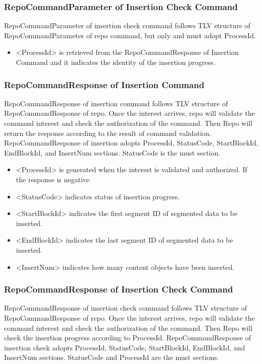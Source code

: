 \documentclass{acm_proc_article-sp}
\begin{document}
\subsubsection{RepoCommandParameter of Insertion Check Command}
RepoCommandParameter of insertion check command follows TLV structure of RepoCommandParameter of repo command, but only and must adopt ProcessId.

\begin{itemize}
\item <ProcessId> is retrieved from the RepoCommandResponse of Insertion Command and it indicates the identity of the insertion progress.
\end{itemize}

\subsubsection{RepoCommandResponse of Insertion Command}
RepoCommandResponse of insertion command follows TLV structure of RepoCommandResponse of repo. Once the interest arrives, repo will validate the command interest and check the authorization of the command. Then Repo will return the response according to the result of command validation. RepoCommandResponse of insertion adopts ProcessId, StatusCode, StartBlockId, EndBlockId, and InsertNum sections. StatusCode is the must section.

\begin{itemize}
\item <ProcessId> is generated when the interest is validated and authorized. If the response is negative
\item <StatusCode> indicates status of insertion progress.
\item <StartBlockId> indicates the first segment ID of segmented data to be inserted.
\item <EndBlockId> indicates the last segment ID of segmented data to be inserted.
\item <InsertNum> indicates how many content objects have been inserted.
\end{itemize}

\subsubsection{RepoCommandResponse of Insertion Check Command}
RepoCommandResponse of insertion check command follows TLV structure of RepoCommandResponse of repo. Once the interest arrives, repo will validate the command interest and check the authorization of the command. Then Repo will check the insertion progress according to ProcessId. RepoCommandResponse of insertion check adopts ProcessId, StatusCode, StartBlockId, EndBlockId, and InsertNum sections. StatusCode and ProcessId are the must sections.
\end{document}

